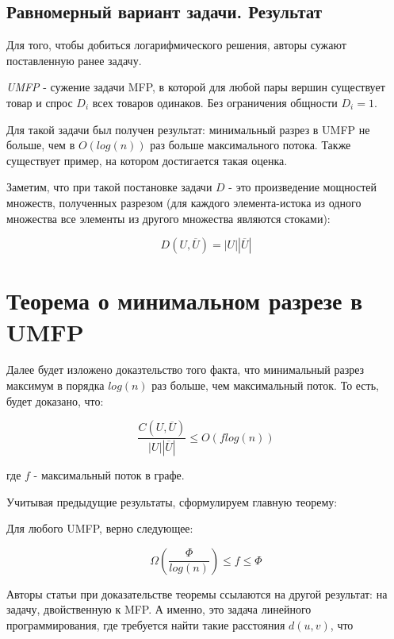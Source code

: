 \documentclass[12pt]{article} %
\begin{document}
\subsection{Равномерный вариант задачи. Результат}

Для того, чтобы добиться логарифмического решения, авторы сужают поставленную ранее задачу.

\begin{Def}
    \emph{UMFP} - сужение задачи MFP, в которой для любой пары вершин существует товар и спрос $D_i$ всех товаров одинаков. Без ограничения общности $D_i = 1$.
\end{Def}

Для такой задачи был получен результат: минимальный разрез в UMFP не больше, чем в $O(log(n))$ раз больше максимального потока. Также существует пример, на котором достигается такая оценка.

Заметим, что при такой постановке задачи $D$ - это произведение мощностей множеств, полученных разрезом (для каждого элемента-истока из одного множества все элементы из другого множества являются стоками):

$$D(U, \overline{U}) = |U| |\overline{U}|$$

\newpage

\section{Теорема о минимальном разрезе в UMFP}

Далее будет изложено доказтельство того факта, что минимальный разрез максимум в порядка $log(n)$ раз больше, чем максимальный поток. То есть, будет доказано, что:

$$\frac{C(U, \overline{U})}{|U| |\overline{U}|} \leq O(f log(n))$$

где $f$ - максимальный поток в графе.

Учитывая предыдущие результаты, сформулируем главную теорему:

\begin{Theorem}
    Для любого UMFP, верно следующее:
    
    $$\Omega(\frac{\Phi}{log(n)}) \leq f \leq \Phi$$
\end{Theorem}

Авторы статьи при доказательстве теоремы ссылаются на другой результат: на задачу, двойственную к MFP. А именно, это задача линейного программирования, где требуется найти такие расстояния $d(u, v)$, что 
\end{document}
